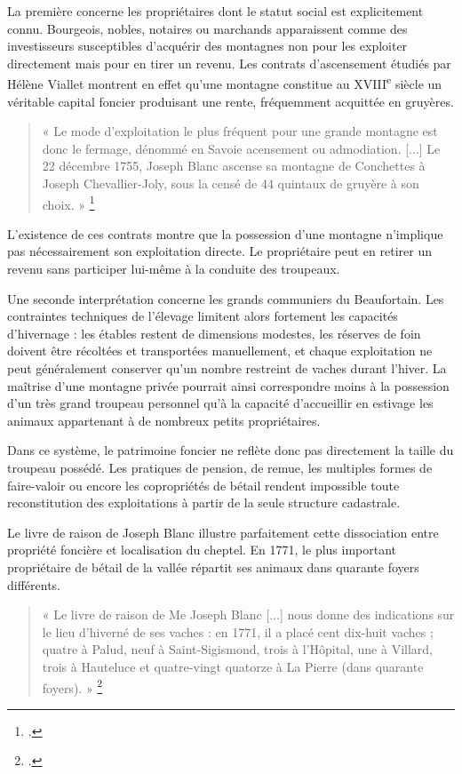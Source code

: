 \documentclass[12pt,a4paper]{report}
\begin{document}
	La première concerne les propriétaires dont le statut social est explicitement connu. Bourgeois, nobles, notaires ou marchands apparaissent comme des investisseurs susceptibles d'acquérir des montagnes non pour les exploiter directement mais pour en tirer un revenu. Les contrats d'ascensement étudiés par Hélène Viallet montrent en effet qu'une montagne constitue au XVIII\textsuperscript{e} siècle un véritable capital foncier produisant une rente, fréquemment acquittée en gruyères.
	
	\begin{quote}
		« Le mode d'exploitation le plus fréquent pour une grande montagne est donc le fermage, dénommé en Savoie acensement ou admodiation. [...] Le 22 décembre 1755, Joseph Blanc ascense sa montagne de Conchettes à Joseph Chevallier-Joly, sous la censé de 44 quintaux de gruyère à son choix. »
		\footcite[113]{HViallet1993}
	\end{quote}
	
	L'existence de ces contrats montre que la possession d'une montagne n'implique pas nécessairement son exploitation directe. Le propriétaire peut en retirer un revenu sans participer lui-même à la conduite des troupeaux.
	
	Une seconde interprétation concerne les grands communiers du Beaufortain. Les contraintes techniques de l'élevage limitent alors fortement les capacités d'hivernage : les étables restent de dimensions modestes, les réserves de foin doivent être récoltées et transportées manuellement, et chaque exploitation ne peut généralement conserver qu'un nombre restreint de vaches durant l'hiver. La maîtrise d'une montagne privée pourrait ainsi correspondre moins à la possession d'un très grand troupeau personnel qu'à la capacité d'accueillir en estivage les animaux appartenant à de nombreux petits propriétaires.
	
	Dans ce système, le patrimoine foncier ne reflète donc pas directement la taille du troupeau possédé. Les pratiques de pension, de remue, les multiples formes de faire-valoir ou encore les copropriétés de bétail rendent impossible toute reconstitution des exploitations à partir de la seule structure cadastrale.

	Le livre de raison de Joseph Blanc illustre parfaitement cette dissociation entre propriété foncière et localisation du cheptel. En 1771, le plus important propriétaire de bétail de la vallée répartit ses animaux dans quarante foyers différents.
	
	\begin{quote}
		« Le livre de raison de Me Joseph Blanc [...] nous donne des indications sur le lieu d'hiverné de ses vaches : en 1771, il a placé cent dix-huit vaches ; quatre à Palud, neuf à Saint-Sigismond, trois à l'Hôpital, une à Villard, trois à Hauteluce et quatre-vingt quatorze à La Pierre (dans quarante foyers). »
		\footcite[58]{HViallet1993}
	\end{quote}
	
\end{document}

